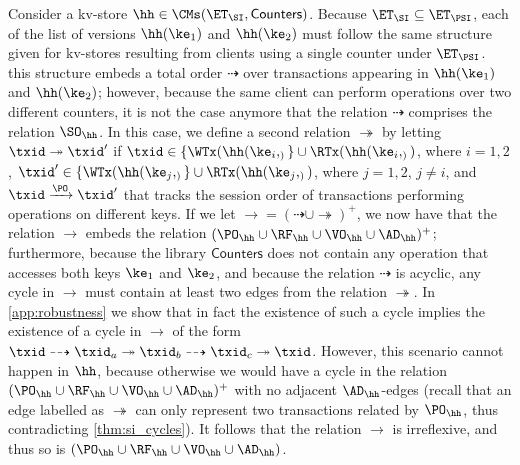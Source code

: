 Consider a kv-store $\hh \in \CMs(\ET_{\SI}, \mathsf{Counters})$. 
Because $\ET_{\SI} \subseteq \ET_{\PSI}$, each of the list of versions $\hh(\ke_1)$ and 
$\hh(\ke_2)$ must follow the same structure given for kv-stores resulting from clients 
using a single counter under $\ET_{\PSI}$. this structure embeds a total order $\dashrightarrow$ 
over transactions appearing in $\hh(\ke_1)$ and $\hh(\ke_2)$; however, because the same 
client can perform operations over two different counters, it is not the case anymore that 
the relation $\dashrightarrow$ comprises the relation $\SO_{\hh}$. In this case, 
we define a second relation $\twoheadrightarrow$ by letting $\txid \twoheadrightarrow 
\txid'$ if $\txid \in \{\WTx(\hh(\ke_{i}, _)\} \cup \RTx(\hh(\ke_{i}, _))$, where $i=1,2$, 
$\txid' \in \{\WTx(\hh(\ke_{j}, _)\} \cup \RTx(\hh(\ke_{j}, _))$, where $j=1,2$, $j \neq i$,  
and $\txid \xrightarrow{\PO} \txid'$ that tracks the session order of transactions 
performing operations on different keys. If we let $\rightarrow = (\dashrightarrow \cup \twoheadrightarrow)^{+}$, 
we now have that the relation $\rightarrow$ embeds the relation $(\PO_{\hh} \cup \RF_{\hh} \cup 
\VO_{\hh} \cup \AD_{\hh})^{+}$; furthermore, because the library $\mathsf{Counters}$ does 
not contain any operation that accesses both keys $\ke_1$ and $\ke_2$, 
and because the relation $\dashrightarrow$ is acyclic, 
any cycle in $\rightarrow$ must contain at least two edges from the relation $\twoheadrightarrow$. 
In \cref{app:robustness} we show that in fact the existence of such a cycle implies the 
existence of a cycle in $\rightarrow$ of the form $\txid \dashrightarrow \txid_{a} \twoheadrightarrow 
\txid_{b} \dashrightarrow \txid_{c} \twoheadrightarrow \txid$. However, this scenario cannot 
happen in $\hh$, because otherwise we would have a cycle in the relation $(\PO_{\hh} \cup \RF_{\hh} 
\cup \VO_{\hh} \cup \AD_{\hh})^{+}$ with no adjacent $\AD_{\hh}$-edges (recall that an edge 
labelled as $\twoheadrightarrow$ can only  represent two transactions related by $\PO_{\hh}$, 
thus contradicting \cref{thm:si_cycles}). It follows that the relation $\rightarrow$ is irreflexive, 
and thus so is $(\PO_{\hh} \cup \RF_{\hh} \cup \VO_{\hh} \cup \AD_{\hh})$.


